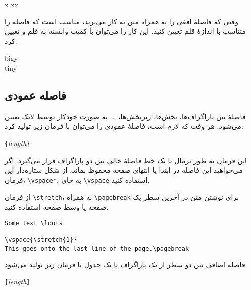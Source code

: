\begin{example}
x
xx
\end{example}


وقتی که فاصلهٔ افقی را به همراه متن به کار می‌برید، مناسب است که فاصله را متناسب با اندازهٔ قلم تعیین کنید. این کار را می‌توان با کمیت وابسته به قلم   و  تعیین کرد:


\begin{example}
{\Large{}big\hspace{1em}y}\\
{\tiny{}tin\hspace{1em}y}
\end{example}

\subsection{فاصله عمودی}

فاصلهٔ بین پاراگراف‌ها، بخش‌ها، زیربخش‌ها،  \ldots\ به صورت خودکار توسط لاتک تعیین می‌شود. هر وقت که لازم است، فاصلهٔ عمودی  
را می‌توان با فرمان زیر تولید کرد:

\begin{lscommand}
\verb|{|\emph{length}\verb|}|
\end{lscommand}


این فرمان به طور نرمال  با یک خط فاصلهٔ خالی بین دو پاراگراف قرار می‌گیرد. اگر می‌خواهید این فاصله در ابتدا یا انتهای صفحه محفوظ بماند، از شکل ستاره‌دار این فرمان، \verb|\vspace*|، به جای \verb|\vspace| استفاده کنید.

از فرمان \verb|\stretch|، به همراه \verb|\pagebreak| برای نوشتن متن در آخرین سطر یک صفحه یا وسط صفحه استفاده کنید.

\begin{code}
\begin{verbatim}
Some text \ldots

\vspace{\stretch{1}}
This goes onto the last line of the page.\pagebreak
\end{verbatim}
\end{code}


فاصلهٔ اضافی بین دو سطر از یک پاراگراف یا یک جدول با فرمان زیر تولید می‌شود.

\begin{lscommand}
\ci{\bs}\verb|[|\emph{length}\verb|]|
\end{lscommand}
 

